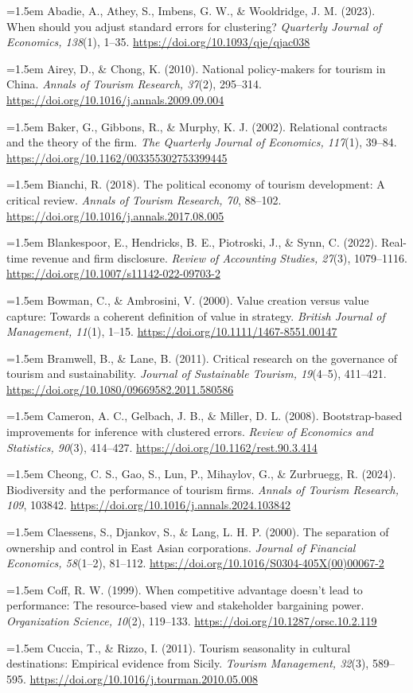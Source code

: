 \documentclass[review,3p,times]{elsarticle}
\def\refitem#1{\noindent\hangindent=1.5em\hangafter=1 #1\par\medskip}
\begin{document}
\refitem{Abadie, A., Athey, S., Imbens, G. W., \& Wooldridge, J. M. (2023). When should you adjust standard errors for clustering? \emph{Quarterly Journal of Economics, 138}(1), 1--35. \url{https://doi.org/10.1093/qje/qjac038}}
\refitem{Airey, D., \& Chong, K. (2010). National policy-makers for tourism in China. \emph{Annals of Tourism Research, 37}(2), 295--314. \url{https://doi.org/10.1016/j.annals.2009.09.004}}
\refitem{Baker, G., Gibbons, R., \& Murphy, K. J. (2002). Relational contracts and the theory of the firm. \emph{The Quarterly Journal of Economics, 117}(1), 39--84. \url{https://doi.org/10.1162/003355302753399445}}
\refitem{Bianchi, R. (2018). The political economy of tourism development: A critical review. \emph{Annals of Tourism Research, 70}, 88--102. \url{https://doi.org/10.1016/j.annals.2017.08.005}}
\refitem{Blankespoor, E., Hendricks, B. E., Piotroski, J., \& Synn, C. (2022). Real-time revenue and firm disclosure. \emph{Review of Accounting Studies, 27}(3), 1079--1116. \url{https://doi.org/10.1007/s11142-022-09703-2}}
\refitem{Bowman, C., \& Ambrosini, V. (2000). Value creation versus value capture: Towards a coherent definition of value in strategy. \emph{British Journal of Management, 11}(1), 1--15. \url{https://doi.org/10.1111/1467-8551.00147}}
\refitem{Bramwell, B., \& Lane, B. (2011). Critical research on the governance of tourism and sustainability. \emph{Journal of Sustainable Tourism, 19}(4--5), 411--421. \url{https://doi.org/10.1080/09669582.2011.580586}}
\refitem{Cameron, A. C., Gelbach, J. B., \& Miller, D. L. (2008). Bootstrap-based improvements for inference with clustered errors. \emph{Review of Economics and Statistics, 90}(3), 414--427. \url{https://doi.org/10.1162/rest.90.3.414}}
\refitem{Cheong, C. S., Gao, S., Lun, P., Mihaylov, G., \& Zurbruegg, R. (2024). Biodiversity and the performance of tourism firms. \emph{Annals of Tourism Research, 109}, 103842. \url{https://doi.org/10.1016/j.annals.2024.103842}}
\refitem{Claessens, S., Djankov, S., \& Lang, L. H. P. (2000). The separation of ownership and control in East Asian corporations. \emph{Journal of Financial Economics, 58}(1--2), 81--112. \url{https://doi.org/10.1016/S0304-405X(00)00067-2}}
\refitem{Coff, R. W. (1999). When competitive advantage doesn't lead to performance: The resource-based view and stakeholder bargaining power. \emph{Organization Science, 10}(2), 119--133. \url{https://doi.org/10.1287/orsc.10.2.119}}
\refitem{Cuccia, T., \& Rizzo, I. (2011). Tourism seasonality in cultural destinations: Empirical evidence from Sicily. \emph{Tourism Management, 32}(3), 589--595. \url{https://doi.org/10.1016/j.tourman.2010.05.008}}
\end{document}
